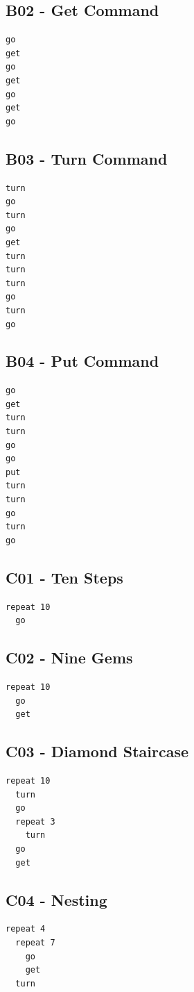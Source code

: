 \documentclass[article,A4,12pt]{llncs}
\begin{document}
\subsection{B02 - Get Command}
\begin{verbatim}
go
get
go
get
go
get 
go
\end{verbatim}



\subsection{B03 - Turn Command}
\begin{verbatim}
turn 
go
turn
go
get
turn
turn
turn
go
turn 
go
\end{verbatim}



\subsection{B04 - Put Command}
\begin{verbatim}
go
get
turn
turn
go
go
put
turn
turn
go
turn 
go
\end{verbatim}


\subsection{C01 - Ten Steps}
\begin{verbatim}
repeat 10
  go
\end{verbatim}



\subsection{C02 - Nine Gems}
\begin{verbatim}
repeat 10
  go
  get
\end{verbatim}




\subsection{C03 - Diamond Staircase}
\begin{verbatim}
repeat 10
  turn
  go
  repeat 3
    turn
  go 
  get
\end{verbatim}



\subsection{C04 - Nesting}
\begin{verbatim}
repeat 4
  repeat 7
    go
    get
  turn
\end{verbatim}
\end{document}
